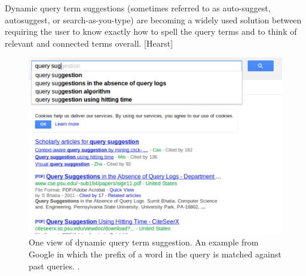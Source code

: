 \documentclass{sigchi}
\begin{document}
Dynamic query term suggestions (sometimes referred to as auto-suggest, autosuggest, or search-as-you-type) are becoming a widely used solution between requiring the user to know exactly how to spell the query terms and to think of relevant and connected terms overall. [Hearst]

\begin{figure}[htp] %
\caption{One view of dynamic query term suggestion. An example from Google in which the prefix of a word in the query is matched against past queries. \protect.} \label{figure_querysuggestion2}
\includegraphics[scale=0.41]{figures/dynamicQueryTermSuggestion2.pdf} 
\end{figure}
\end{document}

